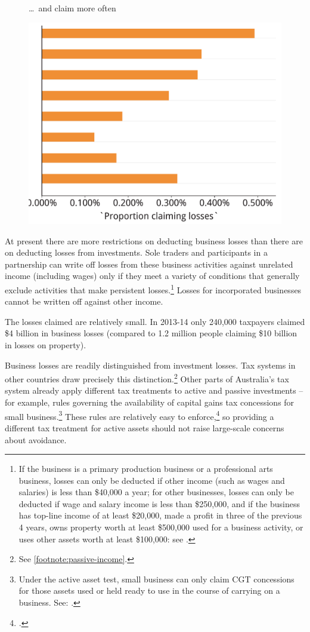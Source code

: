 \begin{figure}[t]
\caption*{\dots\ and claim more often}
\includegraphics[width=0.8\columnwidth]{CGT-NG-atlas/b5-palatino-atlas/Proportions-PP-losses-1.pdf}
\caption*{}
\end{figure}

At present there are more restrictions on deducting business losses than there are on deducting losses from investments. Sole traders and participants in a partnership can write off losses from these business activities against unrelated income (including wages) only if they meet a variety of conditions that generally exclude activities that make persistent losses.\footnote{If the business is a primary production business or a professional arts business, losses can only be deducted if other income (such as wages and salaries) is less than \$40,000 a year; for other businesses, losses can only be deducted if wage and salary income is less than \$250,000, and if the business has top-line income of at least \$20,000, made a profit in three of the previous 4 years, owns property worth at least \$500,000 used for a business activity, or uses other assets worth at least \$100,000: see \textcite{ATO2015OffsettingCurrentYearLosses}.} Losses for incorporated businesses cannot be written off against other income. 

The losses claimed are relatively small. In 2013-14 only 240,000 taxpayers claimed \$4 billion in business losses (compared to 1.2 million people claiming \$10 billion in losses on property).\label{insec:number-taxpayers-claiming-business-losses}

Business losses are readily distinguished from investment losses. Tax systems in other countries draw precisely this distinction.\footnote{See \stopifendnote{}\vref{footnote:passive-income}.} Other parts of Australia’s tax system already apply different tax treatments to active and passive investments – for example, rules governing the availability of capital gains tax concessions for small business.\footnote{Under the active asset test, small business can only claim CGT concessions for those assets used or held ready to use in the course of carrying on a business. See: \textcite{ATO2015ActiveAssetTest}.} These rules are relatively easy to enforce,\footcite{Mather2016} so providing a different tax treatment for active assets should not raise large-scale concerns about avoidance. 

